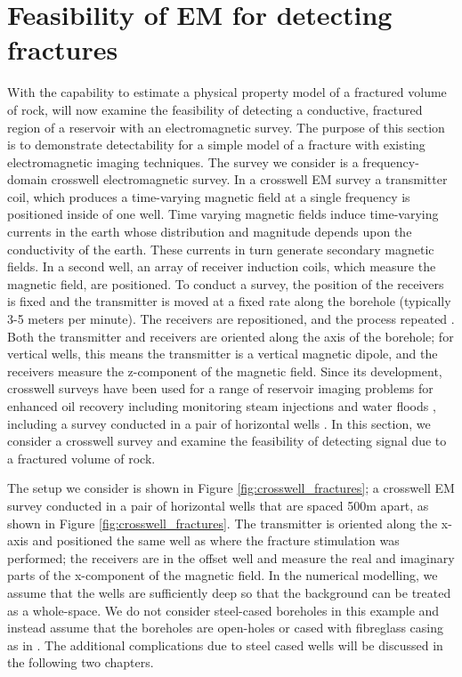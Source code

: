 \section{Feasibility of EM for detecting fractures}
With the capability to estimate a physical property model of a fractured volume of rock, will now examine the feasibility of detecting a conductive, fractured region of a reservoir with an electromagnetic survey. The purpose of this section is to demonstrate detectability for a simple model of a fracture with existing electromagnetic imaging techniques. The survey we consider is a frequency-domain crosswell electromagnetic survey. In a crosswell EM survey a transmitter coil, which produces a time-varying magnetic field at a single frequency is positioned inside of one well. Time varying magnetic fields induce time-varying currents in the earth whose distribution and magnitude depends upon the conductivity of the earth. These currents in turn generate secondary magnetic fields. In a second well, an array of receiver induction coils, which measure the magnetic field, are positioned. To conduct a survey, the position of the receivers is fixed and the transmitter is moved at a fixed rate along the borehole (typically 3-5 meters per minute). The receivers are repositioned, and the process repeated \citep{Wilt1995}. Both the transmitter and receivers are oriented along the axis of the borehole; for vertical wells, this means the transmitter is a vertical magnetic dipole, and the receivers measure the z-component of the magnetic field. Since its development, crosswell surveys have been used for a range of reservoir imaging problems for enhanced oil recovery including monitoring steam injections \citep{Wilt1997} and water floods \citep{Wilt2012}, including a survey conducted in a pair of horizontal wells \citep{Marsala2015, Marsala2015a}. In this section, we consider a crosswell survey and examine the feasibility of detecting signal due to a fractured volume of rock.

The setup we consider is shown in Figure \ref{fig:crosswell_fractures}; a crosswell EM survey conducted in a pair of horizontal wells that are spaced 500m apart, as shown in Figure \ref{fig:crosswell_fractures}. The transmitter is oriented along the x-axis and positioned the same well as where the fracture stimulation was performed; the receivers are in the offset well and measure the real and imaginary parts of the x-component of the magnetic field. In the numerical modelling, we assume that the wells are sufficiently deep so that the background can be treated as a whole-space. We do not consider steel-cased boreholes in this example and instead assume that the boreholes are open-holes or cased with fibreglass casing as in \cite{Wilt2012}. The additional complications due to steel cased wells will be discussed in the following two chapters.

